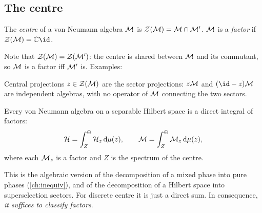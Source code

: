 \subsection{The centre}

\begin{definition}
The \emph{centre} of a von Neumann algebra $\mathcal{M}$ is $\mathcal{Z}(\mathcal{M})=\mathcal{M}\cap\mathcal{M}'$. $\mathcal{M}$ is a \emph{factor} if $\cZ(\M)=\C\id$.
\end{definition}

Note that $\mathcal{Z}(\mathcal{M})=\mathcal{Z}(\mathcal{M}')$: the centre is shared between $\mathcal{M}$ and its commutant, so $\mathcal{M}$ is a factor iff $\mathcal{M}'$ is. Examples:
\begin{center}
\renewcommand{\arraystretch}{1.3}
\end{center}
Central projections $z\in\mathcal{Z}(\mathcal{M})$ are the sector projections: $z\mathcal{M}$ and $(\id-z)\M$ are independent algebras, with no operator of $\mathcal{M}$ connecting the two sectors.

\begin{theorem}
Every von Neumann algebra on a separable Hilbert space is a direct integral of factors:
\begin{equation}
\mathcal{H}=\int^\oplus_Z\mathcal{H}_z\,\mathrm{d}\mu(z),\qquad\mathcal{M}=\int^\oplus_Z\mathcal{M}_z\,\mathrm{d}\mu(z),
\end{equation}
where each $\mathcal{M}_z$ is a factor and $Z$ is the spectrum of the centre.
\end{theorem}
This is the algebraic version of the decomposition of a mixed phase into pure phases (\cref{ch:inequiv}), and of the decomposition of a Hilbert space into superselection sectors. For discrete centre it is just a direct sum. In consequence, \emph{it suffices to classify factors}.

